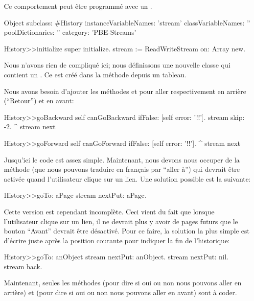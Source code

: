 \documentclass[a4paper,10pt,twoside]{book}
\begin{document}
Ce comportement peut être programmé avec un .

\begin{code}{}
Object subclass: #History
  instanceVariableNames: 'stream'
  classVariableNames: ''
  poolDictionaries: ''
  category: 'PBE-Streams'

History>>initialize
    super initialize.
    stream := ReadWriteStream on: Array new.
\end{code}

Nous n'avons rien de compliqué ici; nous définissons une nouvelle classe
qui contient un \stream. Ce \stream est créé dans la méthode  
depuis un tableau.

Nous avons besoin d'ajouter les méthodes  et  pour aller respectivement en arrière (``Retour'') et en avant:

\begin{code}{}
History>>goBackward
  self canGoBackward ifFalse: [self error: '!!'].
  stream skip: -2. 
  ^ stream next

History>>goForward
  self canGoForward ifFalse: [self error: '!!'].
  ^ stream next
\end{code}

Jusqu'ici le code est assez simple. Maintenant, nous devons nous occuper
de la méthode  (que nous pouvons traduire en français par ``aller à'') qui devrait être activée quand l'utilisateur clique sur un lien. Une solution possible est la suivante:

\begin{code}{}
History>>goTo: aPage
    stream nextPut: aPage.
\end{code}

Cette version est cependant incomplète. Ceci vient du fait que lorsque l'utilisateur clique sur un lien, il ne devrait plus y avoir de pages futurs \ie que le bouton ``Avant'' devrait être désactivé.
Pour ce faire, la solution la plus simple est d'écrire 
juste après la position courante pour indiquer la fin de l'historique:

\begin{code}{}
History>>goTo: anObject
  stream nextPut: anObject.
  stream nextPut: nil.
  stream back.
\end{code}

Maintenant, seules les méthodes  (pour dire si oui ou non nous pouvons aller en arrière) et  (pour dire si oui ou non nous pouvons aller en avant) sont à coder.
\end{document}
